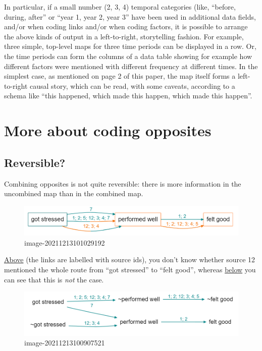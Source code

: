 \documentclass[
]{book}
\begin{document}
In particular, if a small number (2, 3, 4) temporal categories (like, ``before, during, after'' or ``year 1, year 2, year 3'' have been used in additional data fields, and/or when coding links and/or when coding factors, it is possible to arrange the above kinds of output in a left-to-right, storytelling fashion. For example, three simple, top-level maps for three time periods can be displayed in a row. Or, the time periods can form the columns of a data table showing for example how different factors were mentioned with different frequency at different times. In the simplest case, as mentioned on page 2 of this paper, the map itself forms a left-to-right causal story, which can be read, with some caveats, according to a schema like ``this happened, which made this happen, which made this happen''.

\hypertarget{more-about-coding-opposites}{%
\chapter{More about coding opposites}\label{more-about-coding-opposites}}

\hypertarget{reversible}{%
\section{Reversible?}\label{reversible}}

Combining opposites is not quite reversible: there is more information in the uncombined map than in the combined map.

\begin{figure}
\centering
\includegraphics{_assets/image-20211213101029192.png}
\caption{image-20211213101029192}
\end{figure}

\href{causalmap.shinyapps.io/CM2test/?s=364}{Above} (the links are labelled with source ids), you don't know whether source 12 mentioned the whole route from ``got stressed'' to ``felt good'', whereas \href{causalmap.shinyapps.io/CM2test/?s=365}{below} you can see that this is \emph{not} the case.

\begin{figure}
\centering
\includegraphics{_assets/image-20211213100907521.png}
\caption{image-20211213100907521}
\end{figure}
\end{document}

